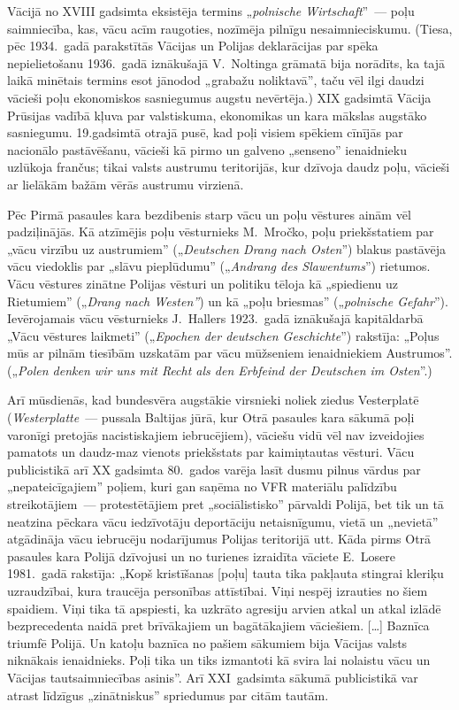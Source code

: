 \documentclass[twoside,a5paper,12pt,fleqn,openany]{extbook}
\newcommand{\detxti}[1]{\textit{\textgerman{#1}}}
\newcommand{\citespace}{[\dots{}]}
\begin{document}
Vācijā no XVIII gadsimta eksistēja termins „\detxti{polnische Wirtschaft}”~--- poļu saimniecība, kas, vācu acīm raugoties, nozīmēja pilnīgu nesaimnieciskumu. (Tiesa, pēc 1934.~gadā parakstītās Vācijas un Polijas deklarācijas par spēka nepielietošanu 1936.~gadā iznākušajā V.~Noltinga grāmatā bija norādīts, ka tajā laikā minētais termins esot jānodod „grabažu noliktavā”, taču vēl ilgi daudzi vācieši poļu ekonomiskos sasniegumus augstu nevērtēja.) XIX gadsimtā Vācija Prūsijas vadībā kļuva par valstiskuma, ekonomikas un kara mākslas augstāko sasniegumu. 19.gadsimtā otrajā pusē, kad poļi visiem spēkiem cīnījās par nacionālo pastāvēšanu, vācieši kā pirmo un galveno „senseno” ienaidnieku uzlūkoja frančus; tikai valsts austrumu teritorijās, kur dzīvoja daudz poļu, vācieši ar lielākām bažām vērās austrumu virzienā.

Pēc Pirmā pasaules kara bezdibenis starp vācu un poļu vēstures ainām vēl padziļinājās. Kā atzīmējis poļu vēsturnieks M.~Mročko, poļu priekšstatiem par „vācu virzību uz austrumiem” („\detxti{Deutschen Drang nach Osten}”) blakus pastāvēja vācu viedoklis par „slāvu pieplūdumu” („\detxti{Andrang des Slawentums}”) rietumos. Vācu vēstures zinātne Polijas vēsturi un politiku tēloja kā „spiedienu uz Rietumiem” („\detxti{Drang nach Westen”}) un kā „poļu briesmas” („\detxti{polnische Gefahr}”). Ievērojamais vācu vēsturnieks J.~Hallers 1923.~gadā iznākušajā kapitāldarbā „Vācu vēstures laikmeti'' („\detxti{Epochen der deutschen Geschichte}'') rakstīja: „Poļus mūs ar pilnām tiesībām uzskatām par vācu mūžseniem ienaidniekiem Austrumos''. („\detxti{Polen denken wir uns mit Recht als den Erbfeind der Deutschen im Osten}”.)

Arī mūsdienās, kad bundesvēra augstākie virsnieki noliek ziedus Vesterplatē (\detxti{Westerplatte}~--- pussala Baltijas jūrā, kur Otrā pasaules kara sākumā poļi varonīgi pretojās nacistiskajiem iebrucējiem), vāciešu vidū vēl nav izveidojies pamatots un daudz-maz vienots priekšstats par kaimiņtautas vēsturi. Vācu publicistikā arī XX gadsimta 80.~gados varēja lasīt dusmu pilnus vārdus par „nepateicīgajiem” poļiem, kuri gan saņēma no VFR materiālu palīdzību streikotājiem~--- protestētājiem pret „sociālistisko” pārvaldi Polijā, bet tik un tā neatzina pēckara vācu iedzīvotāju deportāciju netaisnīgumu, vietā un „nevietā” atgādināja vācu iebrucēju nodarījumus Polijas teritorijā utt. Kāda pirms Otrā pasaules kara Polijā dzīvojusi un no turienes izraidīta vāciete E.~Losere 1981.~gadā rakstīja: „Kopš kristīšanas [poļu] tauta tika pakļauta stingrai kleriķu uzraudzībai, kura traucēja personības attīstībai. Viņi nespēj izrauties no šiem spaidiem. Viņi tika tā apspiesti, ka uzkrāto agresiju arvien atkal un atkal izlādē bezprecedenta naidā pret brīvākajiem un bagātākajiem vāciešiem. \citespace{} Baznīca triumfē Polijā. Un katoļu baznīca no pašiem sākumiem bija Vācijas valsts niknākais ienaidnieks. Poļi tika un tiks izmantoti kā svira lai nolaistu vācu un Vācijas tautsaimniecības asinis”. Arī XXI~gadsimta sākumā publicistikā var atrast līdzīgus „zinātniskus'' spriedumus par citām tautām.
\end{document}
